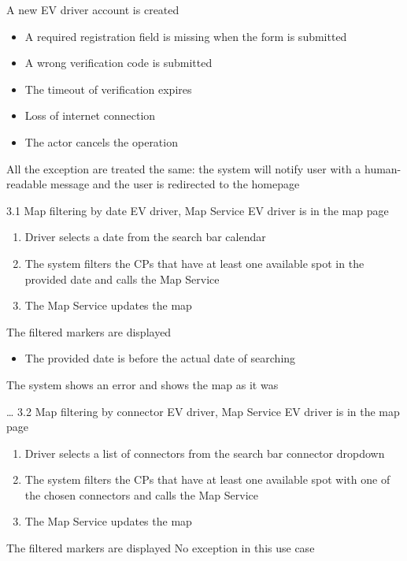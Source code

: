 {A new EV driver account is created}
{
    \begin{itemize}
        \item A required registration field is missing when the form is submitted
        \item A wrong verification code is submitted
        \item The timeout of verification expires
        \item Loss of internet connection
        \item The actor cancels the operation
    \end{itemize}
}
{
    All the exception are treated the same: the system will notify user with a human-readable message and the user is redirected to the homepage
}


\usecase
{

}
{3.1}
{Map filtering by date}
{EV driver, Map Service}
{EV driver is in the map page}
{
    \begin{enumerate}
        \item Driver selects a date from the search bar calendar
        \item The system filters the CPs that have at least one available spot in the provided date and calls the Map Service
        \item The Map Service updates the map
    \end{enumerate}
}
{The filtered markers are displayed}
{
    \begin{itemize}
        \item The provided date is before the actual date of searching
    \end{itemize}
}
{
    The system shows an error and shows the map as it was
}

\usecase
{
    \dots %
}
{3.2}
{Map filtering by connector}
{EV driver, Map Service}
{EV driver is in the map page}
{
    \begin{enumerate}
        \item Driver selects a list of connectors from the search bar connector dropdown
        \item The system filters the CPs that have at least one available spot with one of the chosen connectors and calls the Map Service
        \item The Map Service updates the map
    \end{enumerate}
}
{The filtered markers are displayed}
{
    No exception in this use case
}
{
}

